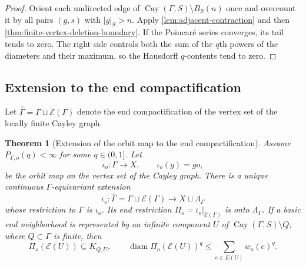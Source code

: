 \documentclass[11pt]{article}
\newtheorem{theorem}{Theorem}[section]
\theoremstyle{definition}
\newcommand{\diam}{\operatorname{diam}}
\newcommand{\Cay}{\operatorname{Cay}}
\begin{document}
\begin{proof}
Orient each undirected edge of $\Cay(\Gamma,S)\setminus B_S(n)$ once and overcount it by all
pairs $(g,s)$ with $|g|_S>n$.  Apply \cref{lem:adjacent-contraction} and then
\cref{thm:finite-vertex-deletion-boundary}.  If the Poincar\'e series converges, its tail tends to zero.  The
right side controls both the sum of the $q$th powers of the diameters and their maximum, so
the Hausdorff $q$-contents tend to zero.
\end{proof}

\subsection{Extension to the end compactification}
Let $\widehat\Gamma=\Gamma\sqcup\mathcal E(\Gamma)$ denote the end compactification of the vertex set
of the locally finite Cayley graph.

\begin{theorem}[Extension of the orbit map to the end compactification]
\label{thm:end-boundary-map}
Assume $P_{\Gamma,o}(q)<\infty$ for some $q\in(0,1]$.  Let
\[
 \iota_o:\Gamma\longrightarrow X,\qquad \iota_o(g)=go,
\]
be the orbit map on the vertex set of the Cayley graph.  There is a unique continuous
$\Gamma$-equivariant extension
\[
 \overline\iota_o:\widehat\Gamma=\Gamma\sqcup\mathcal E(\Gamma)
 \longrightarrow X\sqcup\Lambda_\Gamma
\]
whose restriction to $\Gamma$ is $\iota_o$.  Its end restriction
$\Pi_o=\overline\iota_o|_{\mathcal E(\Gamma)}$ is onto $\Lambda_\Gamma$.  If a basic end neighborhood is represented by an infinite component $U$ of
$\Cay(\Gamma,S)\setminus Q$, where $Q\subset\Gamma$ is finite, then
\begin{equation}\label{eq:basic-end-neighborhood}
 \Pi_o(\mathcal E(U))\subseteq K_{Q,U},\qquad
 \diam\Pi_o(\mathcal E(U))^q\le
 \sum_{e\in E(U)}w_o(e)^q.
\end{equation}
\end{theorem}
\end{document}

